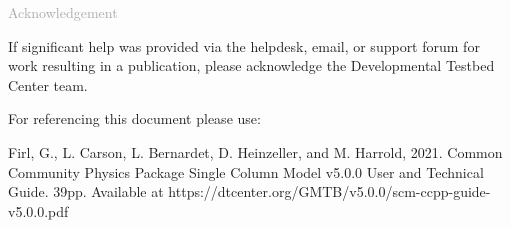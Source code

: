 \begin{titlepage}
\vspace*{0.5cm}
\noindent

\begin{flushleft}
\textcolor{darkgray}{\LARGE Acknowledgement}
\vspace*{1cm}\par

If significant help was provided via the helpdesk, email, or support forum for work resulting in a publication, please acknowledge the Developmental Testbed Center team.\\
\vspace*{1cm}\par
For referencing this document please use:\\
\vspace*{1cm}\par
Firl, G., L. Carson, L. Bernardet, D. Heinzeller, and M. Harrold, 2021. Common Community Physics Package Single Column Model v5.0.0 User and Technical Guide. 39pp. Available at https://dtcenter.org/GMTB/v5.0.0/scm-ccpp-guide-v5.0.0.pdf

\end{flushleft}
\end{titlepage}
\pagebreak{}
